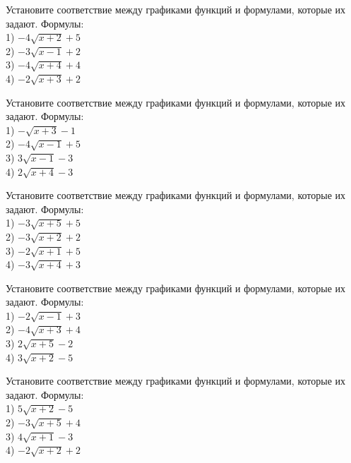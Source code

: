 \documentclass[4apaper]{article}
\begin{document}
\begin{taskBN}{26}
Установите соответствие между графиками функций и формулами, которые их задают. Формулы: \\1) $-4\sqrt{x+2}+5$\\2) $-3\sqrt{x-1}+2$\\3) $-4\sqrt{x+4}+4$\\4) $-2\sqrt{x+3}+2$
\end{taskBN}

\begin{taskBN}{27}
Установите соответствие между графиками функций и формулами, которые их задают. Формулы: \\1) $-\sqrt{x+3}-1$\\2) $-4\sqrt{x-1}+5$\\3) $3\sqrt{x-1}-3$\\4) $2\sqrt{x+4}-3$
\end{taskBN}

\begin{taskBN}{28}
Установите соответствие между графиками функций и формулами, которые их задают. Формулы: \\1) $-3\sqrt{x+5}+5$\\2) $-3\sqrt{x+2}+2$\\3) $-2\sqrt{x+1}+5$\\4) $-3\sqrt{x+4}+3$
\end{taskBN}

\begin{taskBN}{29}
Установите соответствие между графиками функций и формулами, которые их задают. Формулы: \\1) $-2\sqrt{x-1}+3$\\2) $-4\sqrt{x+3}+4$\\3) $2\sqrt{x+5}-2$\\4) $3\sqrt{x+2}-5$
\end{taskBN}

\begin{taskBN}{30}
Установите соответствие между графиками функций и формулами, которые их задают. Формулы: \\1) $5\sqrt{x+2}-5$\\2) $-3\sqrt{x+5}+4$\\3) $4\sqrt{x+1}-3$\\4) $-2\sqrt{x+2}+2$
\end{taskBN}
\end{document}
